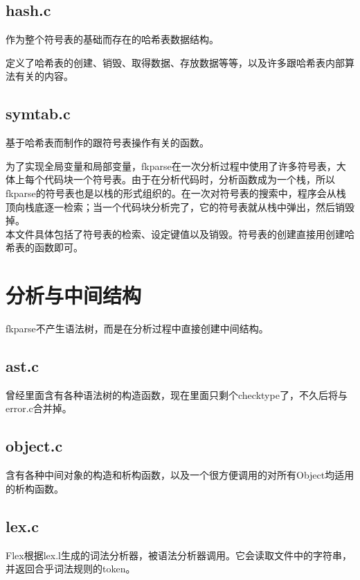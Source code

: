 \subsection{hash.c}

作为整个符号表的基础而存在的哈希表数据结构。

定义了哈希表的创建、销毁、取得数据、存放数据等等，以及许多跟哈希表内部算法有关的内容。

\subsection{symtab.c}

基于哈希表而制作的跟符号表操作有关的函数。

为了实现全局变量和局部变量，fkparse在一次分析过程中使用了许多符号表，大体上每个代码块一个符号表。由于在分析代码时，分析函数成为一个栈，所以fkparse的符号表也是以栈的形式组织的。在一次对符号表的搜索中，程序会从栈顶向栈底逐一检索；当一个代码块分析完了，它的符号表就从栈中弹出，然后销毁掉。\\

本文件具体包括了符号表的检索、设定键值以及销毁。符号表的创建直接用创建哈希表的函数即可。

\section{分析与中间结构}

fkparse不产生语法树，而是在分析过程中直接创建中间结构。

\subsection{ast.c}

曾经里面含有各种语法树的构造函数，现在里面只剩个checktype了，不久后将与error.c合并掉。

\subsection{object.c}

含有各种中间对象的构造和析构函数，以及一个很方便调用的对所有Object均适用的析构函数。

\subsection{lex.c}

Flex根据lex.l生成的词法分析器，被语法分析器调用。它会读取文件中的字符串，并返回合乎词法规则的token。

